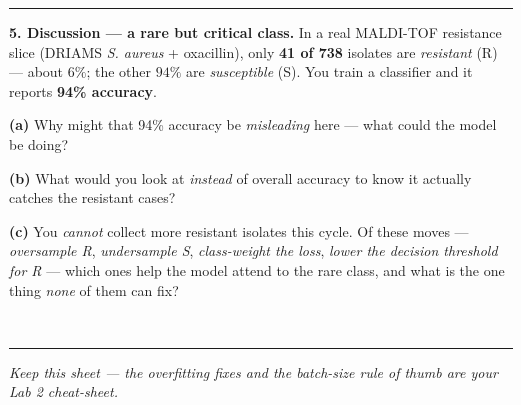 \documentclass[11pt]{article}
\newif\ifsolution
\newcommand{\blk}[1]{\underline{\hspace{#1}}}
\newcommand{\keybox}[1]{\ifsolution\par\vspace{2pt}%
  \fbox{\parbox{0.965\textwidth}{\small\textbf{Answer.}\; #1}}\par\fi}
\newcommand{\work}[1]{\ifsolution\else\vspace{#1}\fi}
\begin{document}
\keybox{(a) $1.0\times0.5^{5}=0.5^{5}=0.03125\approx\mathbf{0.03}$. (b) \textbf{Vanishing} --- every factor is
below~1, so the product shrinks fast. (c) The gradient reaching the earliest layers is almost zero, so
\textbf{those layers barely update / learn} while layers near the output learn fine --- which is why very
deep \emph{plain} networks are hard to train (the fix, ResNet skip connections, is Lecture~5). If each
slope were instead about~2, the product $2^{5}=32$ would \textbf{explode} and the loss would go to NaN.}

\vspace{2pt}\hrule\vspace{5pt}

\textbf{5. Discussion --- a rare but critical class.}\; {\small In a real MALDI-TOF resistance
slice (DRIAMS \emph{S. aureus} + oxacillin), only \textbf{41 of 738} isolates are \emph{resistant} (R)
--- about $6\%$; the other $94\%$ are \emph{susceptible} (S). You train a classifier and it reports
\textbf{94\% accuracy}.}

\vspace{3pt}
\textbf{(a)} Why might that 94\% accuracy be \emph{misleading} here --- what could the model be doing?

\work{1.0cm}
\ifsolution\else\blk{\linewidth}\fi

\textbf{(b)} What would you look at \emph{instead} of overall accuracy to know it actually catches the
resistant cases?

\work{1.2cm}
\ifsolution\else\blk{\linewidth}\fi

\textbf{(c)} You \emph{cannot} collect more resistant isolates this cycle. Of these moves ---
\emph{oversample R}, \emph{undersample S}, \emph{class-weight the loss}, \emph{lower the decision
threshold for R} --- which ones help the model attend to the rare class, and what is the one thing
\emph{none} of them can fix?

\work{1.4cm}
\ifsolution\else\blk{\linewidth}\\[10pt]\blk{\linewidth}\fi

\keybox{(a) A model that simply \textbf{always predicts ``susceptible''} scores $94\%$ accuracy while
catching \emph{zero} of the 41 resistant isolates --- with a rare class, overall accuracy is dominated
by the majority and can hide total failure on the cases that matter most. (b) Look at \textbf{class-specific}
measures: \textbf{sensitivity/recall on the resistant class} (what fraction of true R it catches),
\textbf{precision}, the \textbf{confusion matrix}, and a \textbf{precision--recall curve / PR-AUC}
--- not overall accuracy. (c) \textbf{All four legitimately help} --- oversampling R, undersampling S,
class-weighting, and shifting the threshold all push the model to pay more attention to the 41
resistant cases. But the catch: \textbf{none of them adds new resistant \emph{signal}} --- every one
reuses the same 41 examples --- so the real ceiling still needs \textbf{more / more-varied resistant
data} (more isolates, other sites). \emph{Reweighting $\neq$ new information; all revisited in
Lecture 10.}}

\vspace{4pt}\hrule\vspace{3pt}
{\small\itshape \ifsolution Answer key.\else Keep this sheet --- the overfitting fixes and the
batch-size rule of thumb are your Lab 2 cheat-sheet.\fi}
\end{document}
